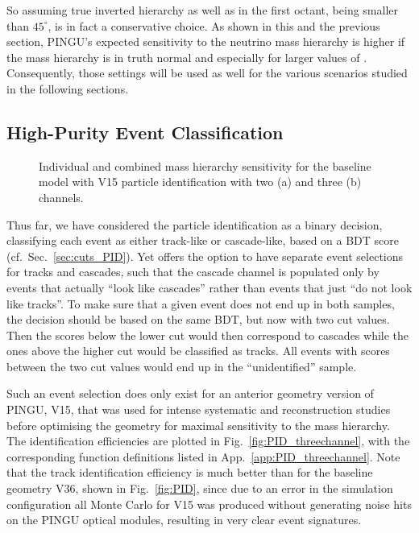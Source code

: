 So assuming true inverted hierarchy as well as  in the first octant,
\ie being smaller than $45^\circ$, is in fact a conservative choice. As shown
in this and the previous section, PINGU's expected sensitivity to the neutrino
mass hierarchy is higher if the mass hierarchy is in truth normal and
especially for larger values of . Consequently, those settings will be
used as well for the various scenarios studied in the following sections.

\subsection{High-Purity Event Classification}
\label{sec:results_includeunkn}

\begin{figure}[thp]
 \centering
 \caption{Individual and combined mass hierarchy sensitivity for the
   baseline model with V15 particle identification with two (a) and three
   (b) channels.}
 \label{fig:sigma_vs_t_HQPID}
\end{figure}

\noindent
Thus far, we have considered the particle identification as a binary decision, 
classifying each event as either track-like or cascade-like, based on a BDT 
score (cf.\ Sec.~\ref{sec:cuts_PID}). Yet \papa offers the option to have 
separate event selections for tracks and cascades, such that \eg the cascade 
channel is populated only by events that actually ``look like cascades'' rather 
than events that just ``do not look like tracks''. To make sure that a given 
event does not end up in both samples, the decision should be based on the same 
BDT, but now with two cut values. Then the scores below the lower cut would 
then \eg correspond to cascades while the ones above the higher cut would be 
classified as tracks. All events with scores between the two cut values would 
end up in the ``unidentified'' sample.

Such an event selection does only exist for an anterior geometry version of 
PINGU, V15, that was used for intense systematic and reconstruction studies 
before optimising the geometry for maximal sensitivity to the mass hierarchy. 
The identification efficiencies are plotted in Fig.~\ref{fig:PID_threechannel}, 
with the corresponding function definitions listed in 
App.~\ref{app:PID_threechannel}. Note that the track identification efficiency 
is much better than for the baseline geometry V36, shown in Fig.~\ref{fig:PID}, 
since due to an error in the simulation configuration all Monte Carlo for V15 
was produced without generating noise hits on the PINGU optical modules, 
resulting in very clear event signatures.

